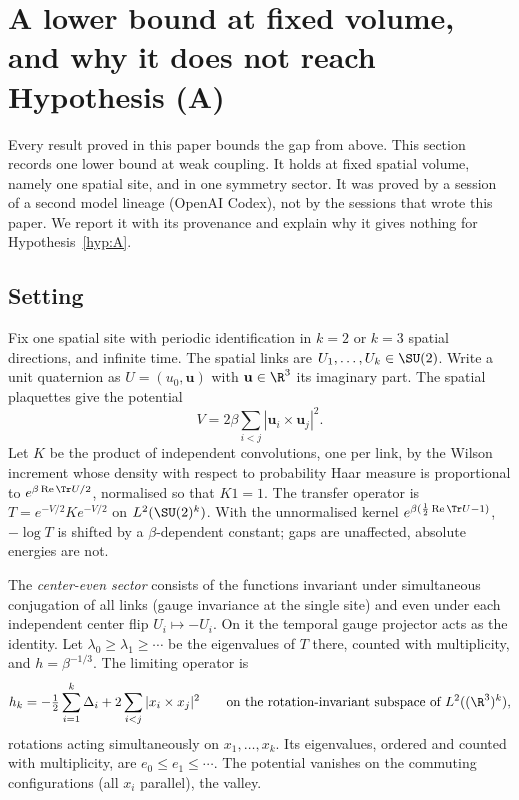 
\section{A lower bound at fixed volume, and why it does not reach Hypothesis (A)}\label{sec:smallbox}

Every result proved in this paper bounds the gap from above. This section records one lower bound
at weak coupling. It holds at fixed spatial volume, namely one spatial site, and in one symmetry sector.
It was proved by a session of a second model lineage (OpenAI Codex), not by the sessions that wrote
this paper. We report it with its provenance and explain why it gives nothing for
Hypothesis~\ref{hyp:A}.

\subsection{Setting}
Fix one spatial site with periodic identification in $k=2$ or $k=3$ spatial directions, and infinite
time. The spatial links are $U_1,\dots,U_k\in\SU(2)$. Write a unit quaternion as $U=(u_0,\mathbf u)$ with
$\mathbf u\in\R^3$ its imaginary part. The spatial plaquettes give the potential
\[
V=2\beta\sum_{i<j}|\mathbf u_i\times\mathbf u_j|^2 .
\]
Let $K$ be the product of independent convolutions, one per link, by the Wilson increment whose
density with respect to probability Haar measure is proportional to $e^{\beta\operatorname{Re}\Tr U/2}$,
normalised so that $K1=1$. The transfer operator is $T=e^{-V/2}Ke^{-V/2}$ on $L^2(\SU(2)^k)$. With the
unnormalised kernel $e^{\beta(\frac12\operatorname{Re}\Tr U-1)}$, $-\log T$ is shifted by a
$\beta$-dependent constant; gaps are unaffected, absolute energies are not.

The \emph{center-even sector} consists of the functions invariant under simultaneous conjugation of all
links (gauge invariance at the single site) and even under each independent center flip
$U_i\mapsto-U_i$. On it the temporal gauge projector acts as the identity. Let
$\lambda_0\ge\lambda_1\ge\cdots$ be the eigenvalues of $T$ there, counted with multiplicity, and
$h=\beta^{-1/3}$. The limiting operator is
\[
h_k=-\tfrac12\sum_{i=1}^k\Delta_i+2\sum_{i<j}|x_i\times x_j|^2
\qquad\text{on the rotation-invariant subspace of }L^2((\R^3)^k),
\]
rotations acting simultaneously on $x_1,\dots,x_k$. Its eigenvalues, ordered and counted with
multiplicity, are $e_0\le e_1\le\cdots$. The potential vanishes on the commuting configurations
(all $x_i$ parallel), the valley.

